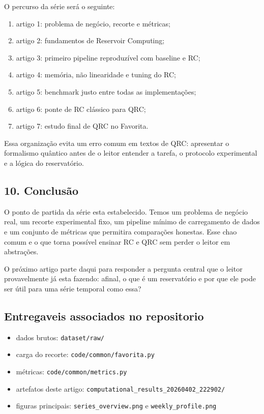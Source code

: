 \documentclass[12pt]{article}
\providecommand{\tightlist}{%
          \setlength{\itemsep}{0pt}\setlength{\parskip}{0pt}}
\begin{document}
O percurso da série será o seguinte:

\begin{enumerate}
\def\labelenumi{\arabic{enumi}.}
\tightlist
\item
  artigo 1: problema de negócio, recorte e métricas;
\item
  artigo 2: fundamentos de Reservoir Computing;
\item
  artigo 3: primeiro pipeline reproduzível com baseline e RC;
\item
  artigo 4: memória, não linearidade e tuning do RC;
\item
  artigo 5: benchmark justo entre todas as implementações;
\item
  artigo 6: ponte de RC clássico para QRC;
\item
  artigo 7: estudo final de QRC no Favorita.
\end{enumerate}

Essa organização evita um erro comum em textos de QRC: apresentar o formalismo quântico antes de o leitor entender a tarefa, o protocolo experimental e a lógica do reservatório.

\subsection{10. Conclusão}\label{10-conclusuxe3o}

O ponto de partida da série esta estabelecido. Temos um problema de negócio real, um recorte experimental fixo, um pipeline mínimo de carregamento de dados e um conjunto de métricas que permitira comparações honestas. Esse chao comum e o que torna possível ensinar RC e QRC sem perder o leitor em abstrações.

O próximo artigo parte daqui para responder a pergunta central que o leitor provavelmente já esta fazendo: afinal, o que é um reservatório e por que ele pode ser útil para uma série temporal como essa?

\subsection{Entregaveis associados no repositorio}\label{entregaveis-associados-no-repositorio}

\begin{itemize}
\tightlist
\item
  dados brutos: \texttt{dataset/raw/}
\item
  carga do recorte: \texttt{code/common/favorita.py}
\item
  métricas: \texttt{code/common/metrics.py}
\item
  artefatos deste artigo: \texttt{computational\_results\_20260402\_222902/}
\item
  figuras principais: \texttt{series\_overview.png} e \texttt{weekly\_profile.png}
\end{itemize}
\end{document}
